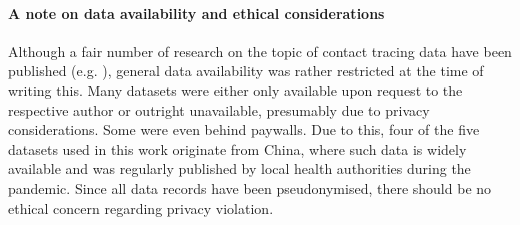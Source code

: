 \paragraph{A note on data availability and ethical considerations} Although a fair number of research on the topic of contact tracing data have been published (e.g. ), general data availability was rather restricted at the time of writing this. Many datasets were either only available upon request to the respective author or outright unavailable, presumably due to privacy considerations. Some were even behind paywalls. Due to this, four of the five datasets used in this work originate from China, where such data is widely available and was regularly published by local health authorities during the pandemic. Since all data records have been pseudonymised, there should be no ethical concern regarding privacy violation.